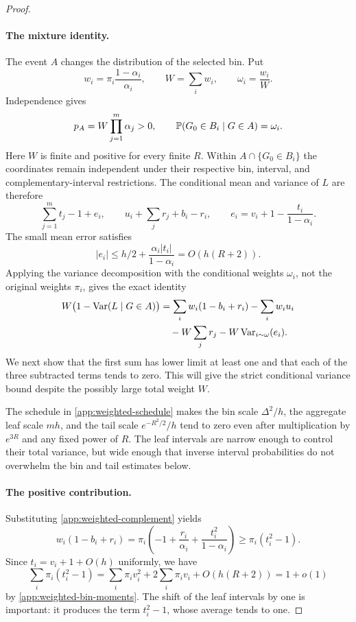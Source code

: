 \begin{proof}
\paragraph{The mixture identity.}
The event $A$ changes the distribution of the selected bin. Put
\[
 w_i=\pi_i\frac{1-\alpha_i}{\alpha_i},\qquad
 W=\sum_iw_i,\qquad \omega_i=\frac{w_i}{W}.
\]
Independence gives
\begin{equation}\label{app:weighted-probability}
 p_A=W\prod_{j=1}^m\alpha_j>0,
 \qquad \mathbb P(G_0\in B_i\mid G\in A)=\omega_i.
\end{equation}
Here $W$ is finite and positive for every finite $R$. Within
$A\cap\{G_0\in B_i\}$ the coordinates remain independent under
their respective bin, interval, and complementary-interval restrictions.
The conditional mean and variance of $L$ are therefore
\[
 \sum_{j=1}^mt_j-1+e_i,
 \qquad u_i+\sum_jr_j+b_i-r_i,
 \qquad e_i=v_i+1-\frac{t_i}{1-\alpha_i}.
\]
The small mean error satisfies
\begin{equation}\label{app:weighted-mean-error}
 |e_i|\le h/2+\frac{\alpha_i|t_i|}{1-\alpha_i}
          =O(h(R+2)).
\end{equation}
Applying the variance decomposition with the conditional weights
$\omega_i$, not the original weights $\pi_i$, gives the exact identity
\begin{align}
 W\bigl(1-\operatorname{Var}(L\mid G\in A)\bigr)
 &=\sum_iw_i(1-b_i+r_i)-\sum_iw_iu_i\notag\\
 &\quad-W\sum_jr_j-W\operatorname{Var}_{i\sim\omega}(e_i).
 \label{app:weighted-variance-identity}
\end{align}
We next show that the first sum has lower limit at least one and
that each of the three subtracted terms tends to zero. This will
give the strict conditional variance bound despite the possibly
large total weight $W$.

The schedule in \eqref{app:weighted-schedule} makes the bin scale
$\Delta^2/h$, the aggregate leaf scale $mh$, and the tail scale
$e^{-R^2/2}/h$ tend to zero even after multiplication by $e^{3R}$
and any fixed power of $R$. The leaf intervals are narrow enough to
control their total variance, but wide enough that inverse interval
probabilities do not overwhelm the bin and tail estimates below.

\paragraph{The positive contribution.}
Substituting \eqref{app:weighted-complement} yields
\begin{equation}\label{app:weighted-positive-term}
 w_i(1-b_i+r_i)
 =\pi_i\left(-1+\frac{r_i}{\alpha_i}
                    +\frac{t_i^2}{1-\alpha_i}\right)
 \ge\pi_i(t_i^2-1).
\end{equation}
Since $t_i=v_i+1+O(h)$ uniformly, we have
\[
 \sum_i\pi_i(t_i^2-1)
 =\sum_i\pi_i v_i^2+2\sum_i\pi_i v_i+O(h(R+2))
 =1+o(1)
\]
by \eqref{app:weighted-bin-moments}. The shift of the leaf intervals
by one is important: it produces the term $t_i^2-1$, whose average
tends to one.


\end{proof}
